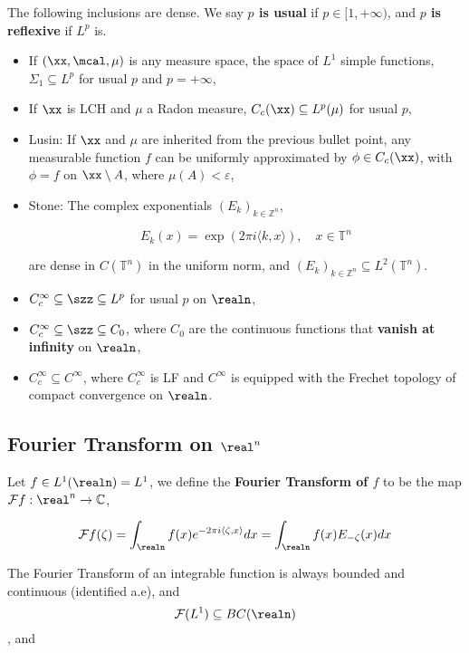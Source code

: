 The following inclusions are dense. We say \textbf{\(p\) is usual} if
\(p\in [1,+\infty)\), and \textbf{\(p\) is reflexive} if \(L^p\) is.

\begin{itemize}
\item
  If \((\xx,\mcal,\mu)\) is any measure space, the space of \(L^1\)
  simple functions, \(\Sigma_{1}\subseteq L^p\) for usual \(p\) and
  \(p=+\infty\),
\item
  If \(\xx\) is LCH and \(\mu\) a Radon measure,
  \(C_c(\xx)\subseteq L^p(\mu)\) for usual \(p\),
\item
  Lusin: If \(\xx\) and \(\mu\) are inherited from the previous bullet
  point, any measurable function \(f\) can be uniformly approximated by
  \(\phi\in C_c(\xx)\), with \(\phi=f\) on \(\xx\setminus A\), where
  \(\mu(A)<\varepsilon\),
\item
  Stone: The complex exponentials \((E_{k})_{k\in\mathbb{Z}^n}\),

  \[E_k(x) = \exp(2\pi i\langle k,x\rangle),\quad x\in\mathbb{T}^n\]

  are dense in \(C(\mathbb{T}^n)\) in the uniform norm, and
  \((E_k)_{k\in \mathbb{Z}^n}\subseteq L^2(\mathbb{T}^n)\).
\item
  \(C_c^\infty\subseteq\szz\subseteq L^p\) for usual \(p\) on
  \(\realn\),
\item
  \(C_c^\infty\subseteq\szz\subseteq C_0\), where \(C_0\) are the
  continuous functions that \textbf{vanish at infinity} on \(\realn\),
\item
  \(C_c^\infty\subseteq C^\infty\), where \(C_c^\infty\) is LF and
  \(C^\infty\) is equipped with the Frechet topology of compact
  convergence on \(\realn\).
\end{itemize}

\hypertarget{fourier-transform-on-realn}{%
\subsection{\texorpdfstring{Fourier Transform on
\(\real^n\)}{Fourier Transform on \textbackslash real\^{}n}}\label{fourier-transform-on-realn}}

Let \(f\in L^1(\realn) = L^1\), we define the \textbf{Fourier Transform
of \(f\)} to be the map \(\mathcal{F}f: \real^n\to\mathbb{C}\),

\[
\mathcal{F}f(\zeta) = \int_{\realn}f(x)e^{-2\pi i\langle \zeta,x\rangle}dx = \int_{\realn} f(x)E_{-\zeta}(x)dx
\]

The Fourier Transform of an integrable function is always bounded and
continuous (identified a.e), and
\[\mathcal{F} (L^1)\subseteq BC(\realn)\], and

